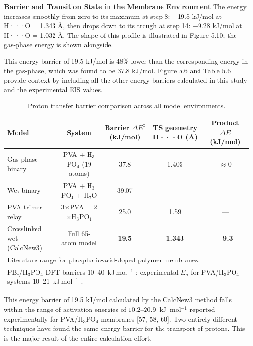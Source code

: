 \documentclass[12pt,a4paper]{report}
\begin{document}
\textbf{Barrier and Transition State in the Membrane Environment}
The energy increases smoothly from zero to its maximum at step 8: +19.5 kJ/mol at H···O = 1.343 Å, then drops down to its trough at step 14: \(-9.28\) kJ/mol at H···O = 1.032 Å. The shape of this profile is illustrated in Figure 5.10; the gas-phase energy is shown alongside.

This energy barrier of 19.5 kJ/mol is 48\% lower than the corresponding energy in the gas-phase, which was found to be 37.8 kJ/mol. Figure 5.6 and Table 5.6 provide context by including all the other energy barriers calculated in this study and the experimental EIS values.

\begin{table}[h!]
\centering
\caption{Proton transfer barrier comparison across all model environments.}
\label{tab:barrier-comparison}
\footnotesize
\setlength{\tabcolsep}{3pt}
\begin{tabular}{l c c c c}
\toprule
Model & System & Barrier \(\Delta E^{\ddagger}\) (kJ/mol) & TS geometry H···O (Å) & Product \(\Delta E\) (kJ/mol) \\
\midrule
Gas-phase binary & PVA + H\(_3\)PO\(_4\) (19 atoms) & 37.8 & 1.405 & \(\approx 0\) \\
Wet binary & PVA + H\(_3\)PO\(_4\) + H\(_2\)O & 39.07 & --- & --- \\
PVA trimer relay & 3\(\times\)PVA + 2\(\times\)H\(_3\)PO\(_4\) & 25.0 & 1.59 & --- \\
Crosslinked wet (CalcNew3) & Full 65-atom model & \textbf{19.5} & \textbf{1.343} & \textbf{\(-\)9.3} \\
\midrule
\multicolumn{5}{l}{\footnotesize Literature range for phosphoric-acid-doped polymer membranes:} \\
\multicolumn{5}{l}{\footnotesize \hspace{1em} PBI/H\(_3\)PO\(_4\) DFT barriers 10--40~kJ\,mol\(^{-1}\) \cite{20,59}; experimental \(E_a\) for PVA/H\(_3\)PO\(_4\) systems 10--21~kJ\,mol\(^{-1}\) \cite{57,58,60}.} \\
\bottomrule
\end{tabular}
\end{table}

This energy barrier of 19.5 kJ/mol calculated by the CalcNew3 method falls within the range of activation energies of $10.2$--$20.9$~kJ~mol$^{-1}$ reported experimentally for PVA/H$_3$PO$_4$ membranes [57, 58, 60]. Two entirely different techniques have found the same energy barrier for the transport of protons. This is the major result of the entire calculation effort.\cite{65, 66, 72, 73}
\end{document}
